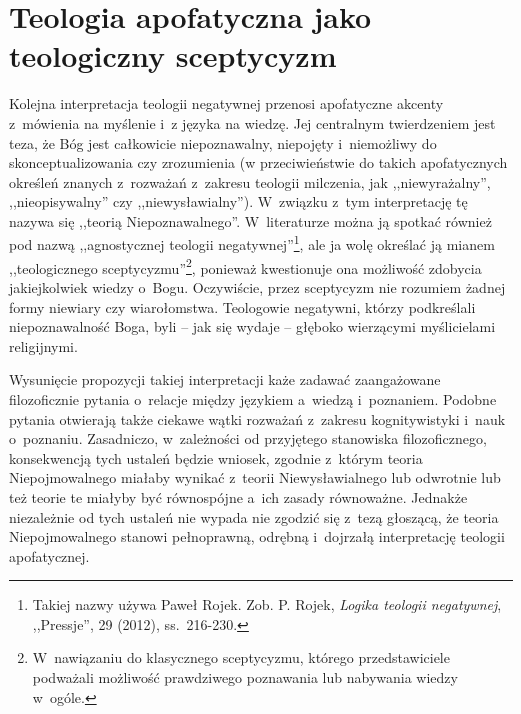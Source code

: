 
\chapter{Teologia apofatyczna jako teologiczny sceptycyzm}\label{scep}




Kolejna interpretacja teologii negatywnej przenosi apofatyczne akcenty z~mówienia na myślenie i~z języka na wiedzę. Jej centralnym twierdzeniem jest teza, że Bóg jest całkowicie niepoznawalny, niepojęty i~niemożliwy do skonceptualizowania czy zrozumienia (w przeciwieństwie do takich apofatycznych określeń znanych z~rozważań z~zakresu teologii milczenia, jak ,,niewyrażalny'', ,,nieopisywalny'' czy ,,niewysławialny''). W~związku z~tym interpretację tę nazywa się ,,teorią Niepoznawalnego''. W~literaturze można ją spotkać również pod nazwą ,,agnostycznej teologii negatywnej''\footnote{Takiej nazwy używa Paweł Rojek. Zob. P. Rojek, \textit{Logika teologii negatywnej}, ,,Pressje'', 29 (2012), ss.~216-230.}, ale ja wolę określać ją mianem ,,teologicznego sceptycyzmu''\footnote{W~nawiązaniu do klasycznego sceptycyzmu, którego przedstawiciele podważali możliwość prawdziwego poznawania lub nabywania wiedzy w~ogóle.}, ponieważ kwestionuje ona możliwość zdobycia jakiejkolwiek wiedzy o~Bogu. Oczywiście, przez sceptycyzm nie rozumiem żadnej formy niewiary czy wiarołomstwa. Teologowie negatywni, którzy podkreślali niepoznawalność Boga, byli -- jak się wydaje -- głęboko wierzącymi myślicielami religijnymi.

Wysunięcie propozycji takiej interpretacji każe zadawać zaangażowane filozoficznie pytania o~relacje między językiem a~wiedzą i~poznaniem. Podobne pytania otwierają także ciekawe wątki rozważań z~zakresu kognitywistyki i~nauk o~poznaniu. Zasadniczo, w~zależności od przyjętego stanowiska filozoficznego, konsekwencją tych ustaleń będzie wniosek, zgodnie z~którym teoria Niepojmowalnego miałaby wynikać z~teorii Niewysławialnego lub odwrotnie lub też teorie te miałyby być równospójne a~ich zasady równoważne. Jednakże niezależnie od tych ustaleń nie wypada nie zgodzić się z~tezą głoszącą, że teoria Niepojmowalnego stanowi pełnoprawną, odrębną i~dojrzałą interpretację teologii apofatycznej.


